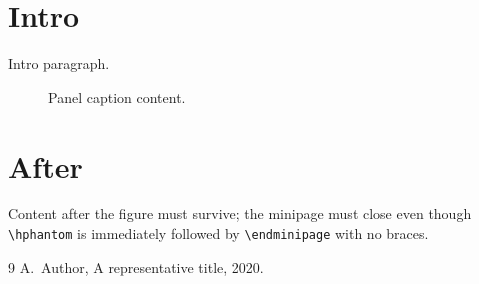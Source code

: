 \documentclass{article}
\begin{document}
\section{Intro}
Intro paragraph.
\begin{figure}
\hphantom
\endminipage\hfill
{}%
Panel caption content.
\endminipage
\end{figure}
\section{After}
Content after the figure must survive; the minipage must close even though
\verb|\hphantom| is immediately followed by \verb|\endminipage| with no braces.
\begin{thebibliography}{9}
 A.~Author, A representative title, 2020.
\end{thebibliography}
\end{document}
